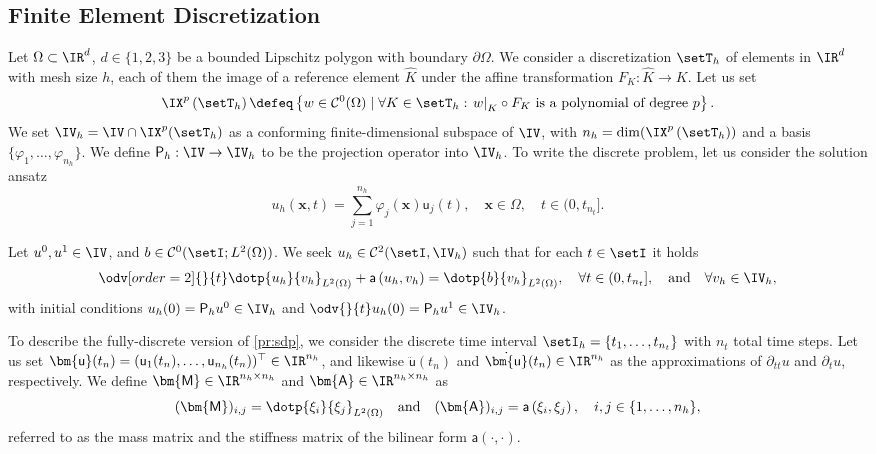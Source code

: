 \subsection{Finite Element Discretization}
\label{ssec:fe_problem}

Let $\Omega \subset \IR^d$, $d\in \{1,2,3\}$ be a bounded Lipschitz polygon with boundary $\partial \Omega$. We consider a discretization $\setT_h$ of elements in $\IR^d$ with mesh size $h$, each of them the image of a reference element $\hat{K}$ under the affine transformation $F_{K}: \hat{K} \rightarrow K$. Let us set
\begin{equation}
	\IX^{p}\left(\setT_h\right) \defeq \left\{	w \in \mathcal{C}^0(\Omega) \mid \forall K \in \setT_h: \left. w\right|_K \circ F_K \text { is a polynomial of degree } p \right\}.
\end{equation}
We set $\IV_h = \IV \cap \IX^p(\setT_h)$ as a conforming finite-dimensional subspace of $\IV$, with $n_h = \dim(\IX^{p} \left(\setT_h\right))$ and a basis $\{\varphi_1,\dots,\varphi_{n_h}\}$. We define $\mathsf{P}_h: \IV \rightarrow \IV_h$ to be the projection operator into $\IV_h$. To write the discrete problem, let us consider the solution ansatz
\begin{equation}
	u_h(\bm{x},t) = \sum_{j=1}^{n_h} \varphi_j(\bm{x}) \mathsf{u}_j(t), \quad\bm{x} \in \Omega, \quad t\in (0,t_{n_t}].
\end{equation}

\begin{problem} \label{pr:sdp}
Let $u^0, u^1 \in \IV$, and $b \in \mathcal{C}^0(\setI ; L^2(\Omega))$. We seek $u_h \in \mathcal{C}^2(\setI, \IV_h)$ such that for each $t \in \setI$ it holds
\begin{align}\label{eq:semi_discrete}
	\odv[order=2]{}{t} \dotp{u_h}{v_h}_{L^2(\Omega)} + \mathsf{a} \left(u_h,v_h\right) = \dotp{b}{v_h}_{L^2(\Omega)}, \quad \forall t \in (0,t_{n_t}], \quad \text{and} \quad \forall v_h \in \IV_h,
\end{align}
with initial conditions $u_h(0) = \mathsf{P}_{h} u^0\in \IV_h$ and $ \odv{}{t} u_h(0) = \mathsf{P}_{h} u^1\in \IV_h$.
\end{problem}

To describe the fully-discrete version of \cref{pr:sdp}, we consider the discrete time interval $\setI_h=\{t_1,\ldots,t_{n_t} \}$ with $n_t$ total time steps. Let us set $\bm{\mathsf{u}}(t_n) = (\mathsf{u}_1(t_n),\dots, \mathsf{u}_{n_h}(t_n))^{\top} \in \IR^{n_h}$, and likewise $\ddot{\bm{\mathsf{u}}}(t_n)$ and $\dot{\bm{\mathsf{u}}}(t_n) \in \IR^{n_h}$ as the approximations of $\partial_{tt} u$ and $\partial_{t} u$, respectively. We define $\bm{\mathsf{M}} \in \IR^{n_h \times n_h}$ and $\bm{\mathsf{A}} \in \IR^{n_h \times n_h}$ as
\begin{equation}
	(\bm{\mathsf{M}})_{i,j} = \dotp{\xi_i}{\xi_j}_{L^2(\Omega)} \quad \text{and} \quad (\bm{\mathsf{A}})_{i,j} = \mathsf{a} \left(\xi_i,\xi_j \right), \quad i,j \in \{1,\dots,n_h\},
\end{equation}
referred to as the mass matrix and the stiffness matrix of the bilinear form $\mathsf{a}(\cdot,\cdot)$.

